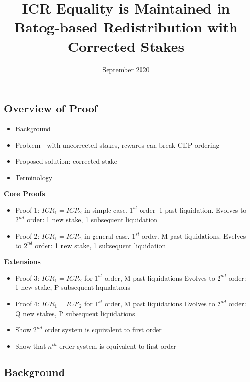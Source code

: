 \documentclass[reqno]{article}
\begin{document}
\title{\textbf{ICR Equality is Maintained in Batog-based Redistribution with Corrected Stakes}}
\date{September 2020}
\maketitle

\subsection*{\textbf{Overview of Proof}}


\begin{itemize}
  \item Background
  \item Problem - with uncorrected stakes, rewards can break CDP ordering
  \item Proposed solution: corrected stake
  \item Terminology
\end{itemize}

\bigskip
\textbf{Core Proofs}

\begin{itemize}
  \item Proof 1: $ICR_1=ICR_2$ in simple case. $1^{st}$ order, 1 past liquidation. Evolves to $2^{nd}$ order: 1 new stake, 1 subsequent liquidation
  \item Proof 2: $ICR_1=ICR_2$ in general case. $1^{st}$ order, M past liquidations. Evolves to $2^{nd}$ order: 1 new stake, 1 subsequent liquidation
\end{itemize}

\bigskip
\textbf{Extensions}

\begin{itemize}
  \item Proof 3: $ICR_1=ICR_2$ for $1^{st}$ order, M past liquidations Evolves to $2^{nd}$ order: 1 new stake, P subsequent liquidations
  \item Proof 4: $ICR_1=ICR_2$ for $1^{st}$ order, M past liquidations Evolves to $2^{nd}$ order: Q new stakes, P subsequent liquidations
  \item Show $2^{nd}$ order system is equivalent to first order 
  \item Show that $n^{th}$ order system is equivalent to first order
\end{itemize}

\bigskip
\subsection*{\textbf{Background}}
\end{document}
